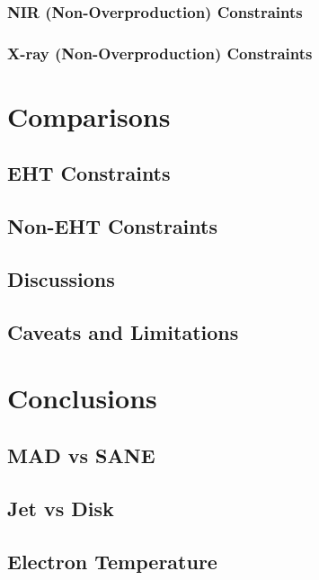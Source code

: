 \documentclass[twocolumn,twocolappendix,tighten,dvipsnames,linenumbers]{aastex63}
\begin{document}
\subsubsection{NIR (Non-Overproduction) Constraints}
\subsubsection{X-ray (Non-Overproduction) Constraints}

\clearpage

\section{Comparisons}

\subsection{EHT Constraints}

\subsection{Non-EHT Constraints}

\subsection{Discussions}

\subsection{Caveats and Limitations}

\clearpage

\section{Conclusions}

\subsection{MAD vs SANE}

\subsection{Jet vs Disk}

\subsection{Electron Temperature}
\end{document}
